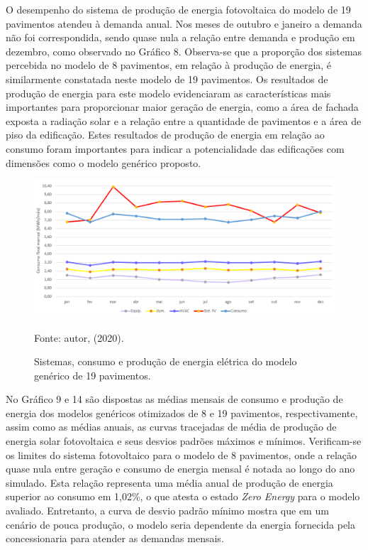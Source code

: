 \noindent O desempenho do sistema de produção de energia fotovoltaica do modelo de 19 pavimentos atendeu à demanda anual. Nos meses de outubro e janeiro a demanda não foi correspondida, sendo quase nula a relação entre demanda e produção em dezembro, como observado no Gráfico 8. Observa-se que a proporção dos sistemas percebida no modelo de 8 pavimentos, em relação à produção de energia, é similarmente constatada neste modelo de 19 pavimentos.\vspace*{0.3cm} \newline
\noindent Os resultados de produção de energia para este modelo evidenciaram as características mais importantes para proporcionar maior geração de energia, como a área de fachada exposta a radiação solar e a relação entre a quantidade de pavimentos e a área de piso da edificação. Estes resultados de produção de energia em relação ao consumo foram importantes para indicar a potencialidade das edificações com dimensões como o modelo genérico proposto.
\begin{figure}[H]
    \centering
    \caption{Sistemas, consumo e produção de energia elétrica do modelo genérico de 19 pavimentos.}
    \includegraphics[width=1.0\textwidth]{figures/result/fig42-consumomod.png}
    \begin{flushleft}
        \par \small Fonte: autor, (2020).
    \end{flushleft}
    \label{fig:figure30}
\end{figure}
\vspace{-0.5cm} \noindent No Gráfico 9 e 14 são dispostas as médias mensais de consumo e produção de energia dos modelos genéricos otimizados de 8 e 19 pavimentos, respectivamente, assim como as médias anuais, as curvas tracejadas de média de produção de energia solar fotovoltaica e seus desvios padrões máximos e mínimos. Verificam-se os limites do sistema fotovoltaico para o modelo de 8 pavimentos, onde a relação quase nula entre geração e consumo de energia mensal é notada ao longo do ano simulado. Esta relação representa uma média anual de produção de energia superior ao consumo em 1,02\%, o que atesta o estado \textit{Zero Energy} para o modelo avaliado. Entretanto, a curva de desvio padrão mínimo mostra que em um cenário de pouca produção, o modelo seria dependente da energia fornecida pela concessionaria para atender as demandas mensais.\vspace{-0.3cm} 
